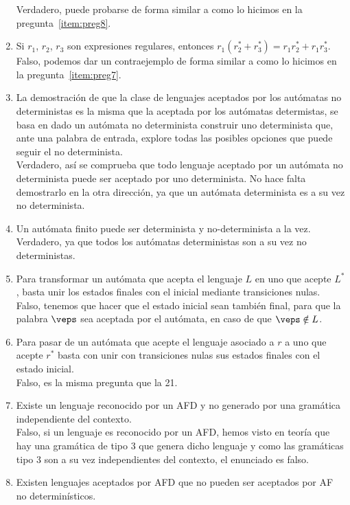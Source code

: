 \begin{enumerate}
        Verdadero, puede probarse de forma similar a como lo hicimos en la pregunta~\ref{item:preg8}.
    \item Si $r_1$, $r_2$, $r_3$ son expresiones regulares, entonces $r_1(r_2^\ast + r_3^\ast) = r_1r_2^\ast + r_1r_3^\ast$.\\

        Falso, podemos dar un contraejemplo de forma similar a como lo hicimos en la pregunta~\ref{item:preg7}.
    \item La demostración de que la clase de lenguajes aceptados por los autómatas no deterministas es la misma que la aceptada por los autómatas determistas, se basa en dado un autómata no determinista construir uno determinista que, ante una palabra de entrada, explore todas las posibles opciones que puede seguir el no determinista.\\

        Verdadero, así se comprueba que todo lenguaje aceptado por un autómata no determinista puede ser aceptado por uno determinista. No hace falta demostrarlo en la otra dirección, ya que un autómata determinista es a su vez no determinista.
    \item Un autómata finito puede ser determinista y no-determinista a la vez.\\

        Verdadero, ya que todos los autómatas deterministas son a su vez no deterministas.
    \item Para transformar un autómata que acepta el lenguaje $L$ en uno que acepte $L^\ast$, basta unir los estados finales con el inicial mediante transiciones nulas.\\

        Falso, tenemos que hacer que el estado inicial sean también final, para que la palabra $\veps$ sea aceptada por el autómata, en caso de que $\veps \notin L$.
    \item Para pasar de un autómata que acepte el lenguaje asociado a $r$ a uno que acepte $r^\ast$ basta con unir con transiciones nulas sus estados finales con el estado inicial.\\

        Falso, es la misma pregunta que la 21.
    \item Existe un lenguaje reconocido por un AFD y no generado por una gramática independiente del contexto.\\

        Falso, si un lenguaje es reconocido por un AFD, hemos visto en teoría que hay una gramática de tipo 3 que genera dicho lenguaje y como las gramáticas tipo 3 son a su vez independientes del contexto, el enunciado es falso.
    \item Existen lenguajes aceptados por AFD que no pueden ser aceptados por AF no determinísticos.\\


\end{enumerate}
